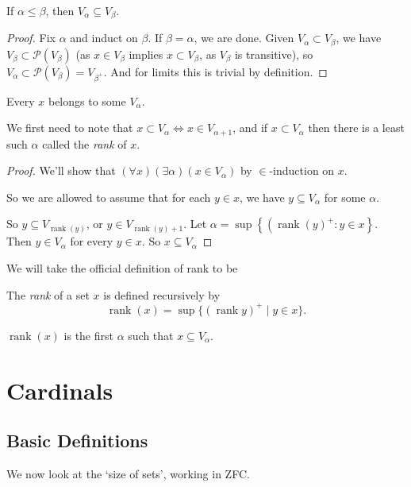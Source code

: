 \documentclass[a3paper, 10pt]{article}
\renewcommand{\vocab}[1]{\emph{#1}}
\begin{document}
\begin{multicols*}{5}
\begin{lemma}
  If $\alpha \leq \beta$, then $V_\alpha \subseteq V_\beta$.
\end{lemma}
\begin{proof}
  Fix $\alpha$ and induct on $\beta$. If $\beta = \alpha$, we are done. Given $V_\alpha \subset V_\beta$, we have $V_\beta \subset \mathcal{P}(V_\beta)$ (as $x \in V_\beta$ implies $x \subset V_\beta$, as $V_\beta$ is transitive), so $V_\alpha \subset \mathcal{P}(V_\beta) = V_{\beta^+}$. And for limits this is trivial by definition.
\end{proof}

\begin{theorem}
  Every $x$ belongs to some $V_\alpha$.
\end{theorem}
We first need to note that $x \subset V_\alpha \Leftrightarrow x \in V_{\alpha+1}$, and if $x \subset V_{\alpha}$ then there is a least such $\alpha$ called the \vocab{rank} of $x$.
\begin{proof}
  We'll show that $(\forall x)(\exists \alpha)\left(x \in V_\alpha\right)$ by $\in$-induction on $x$.

  So we are allowed to assume that for each $y \in x$, we have $y \subseteq V_\alpha$ for some $\alpha$.

  So $y \subseteq V_{\operatorname{rank}(y)}$, or $y \in V_{\operatorname{rank}(y)+1}$.
  Let $\alpha=\sup \left\{\left(\operatorname{rank}(y)^{+}: y \in x\right\}\right.$. Then $y \in V_\alpha$ for every $y \in x$. So $x \subseteq V_\alpha$   
\end{proof}

We will take the official definition of rank to be
\begin{definition}[Rank]
  The \vocab{rank} of a set $x$ is defined recursively by
  $$
\operatorname{rank}(x) = \sup \{(\operatorname{rank} y)^+ \mid y \in x\}.
  $$
\end{definition}

\begin{proposition}
  $\operatorname{rank}(x)$ is the first $\alpha$ such that $x \subseteq V_\alpha$.
\end{proposition}

\section{Cardinals}

\subsection{Basic Definitions}
We now look at the `size of sets', working in ZFC.


\end{multicols*}
\end{document}
